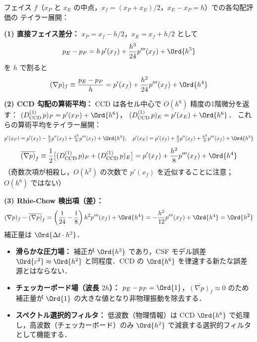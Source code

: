 フェイス $f$（$x_P$ と $x_E$ の中点，$x_f = (x_P+x_E)/2$，$x_E - x_P = h$）での各勾配評価の
テイラー展開：

\textbf{(1) 直接フェイス差分：}
$x_P = x_f - h/2$，$x_E = x_f + h/2$ として
\[
  p_E - p_P = h\,p'(x_f) + \frac{h^3}{24}p'''(x_f) + \Ord{h^5}
\]
を $h$ で割ると
\begin{equation}
  (\nabla p)_f \equiv \frac{p_E - p_P}{h} = p'(x_f) + \frac{h^2}{24}p'''(x_f) + \Ord{h^4}
  \label{eq:rc_face_taylor}
\end{equation}

\textbf{(2) CCD 勾配の算術平均：}
CCD は各セル中心で $O(h^6)$ 精度の1階微分を返す：
$(D^{(1)}_\mathrm{CCD}\,p)_P = p'(x_P) + \Ord{h^6}$，
$(D^{(1)}_\mathrm{CCD}\,p)_E = p'(x_E) + \Ord{h^6}$．
これらの算術平均をテイラー展開：
\[
  p'(x_P) = p'(x_f) - \tfrac{h}{2}p''(x_f) + \tfrac{h^2}{8}p'''(x_f) + \Ord{h^3},
  \quad
  p'(x_E) = p'(x_f) + \tfrac{h}{2}p''(x_f) + \tfrac{h^2}{8}p'''(x_f) + \Ord{h^3}
\]
\begin{equation}
  \overline{(\nabla p)}_f \equiv \frac{1}{2}\bigl[(D^{(1)}_\mathrm{CCD}\,p)_P + (D^{(1)}_\mathrm{CCD}\,p)_E\bigr]
    = p'(x_f) + \frac{h^2}{8}p'''(x_f) + \Ord{h^4}
  \label{eq:rc_avg_taylor}
\end{equation}
（奇数次項が相殺し，$O(h^2)$ の次数で $p'(x_f)$ を近似することに注意；$O(h^6)$ ではない）

\textbf{(3) Rhie-Chow 検出項（差）：}
\begin{equation}
  (\nabla p)_f - \overline{(\nabla p)}_f
  = \left(\frac{1}{24} - \frac{1}{8}\right)h^2 p'''(x_f) + \Ord{h^4}
  = -\frac{h^2}{12}p'''(x_f) + \Ord{h^4} = \Ord{h^2}
  \label{eq:rc_detection_taylor}
\end{equation}
補正量は $\Ord{\Delta t \cdot h^2}$．

\begin{itemize}
  \item \textbf{滑らかな圧力場：} 補正が $\Ord{h^2}$ であり，CSF モデル誤差 $\Ord{\varepsilon^2} \approx \Ord{h^2}$ と同程度．CCD の $\Ord{h^6}$ を律速する新たな誤差源とはならない．
  \item \textbf{チェッカーボード場（波長 $2h$）：} $p_E - p_P = \Ord{1}$，$\overline{(\nabla p)}_f \approx 0$ のため補正量が $\Ord{1}$ の大きな値となり非物理振動を除去する．
  \item \textbf{スペクトル選択的フィルタ：} 低波数（物理情報）は CCD $\Ord{h^6}$ で処理し，高波数（チェッカーボード）のみ $\Ord{h^2}$ で減衰する選択的フィルタとして機能する．
\end{itemize}

